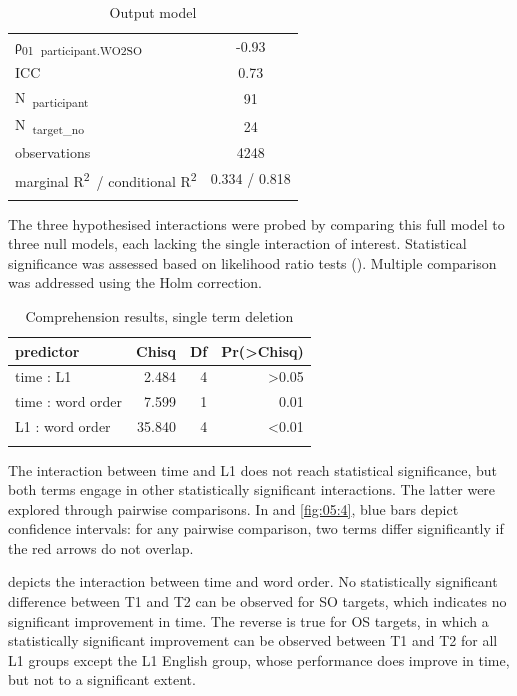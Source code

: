\begin{table}
\begin{tabularx}{\textwidth}{Xrrr}
    ρ\textsubscript{01}~\textsubscript{participant.WO2SO} & \multicolumn{3}{c}{{}-0.93}\\
    ICC & \multicolumn{3}{c}{0.73}\\
    N~\textsubscript{participant} & \multicolumn{3}{c}{91}\\
    N~\textsubscript{target\_no} & \multicolumn{3}{c}{24}\\
    \midrule
    observations & \multicolumn{3}{c}{4248}\\
    marginal R\textsuperscript{2}~/ conditional R\textsuperscript{2} & \multicolumn{3}{c}{0.334 / 0.818}\\
    \lspbottomrule
    \end{tabularx}
    \caption{Output model}
    \label{tab:05:3}
\end{table}

The three hypothesised interactions were probed by comparing this full model to three null models, each lacking the single interaction of interest. Statistical significance was assessed based on likelihood ratio tests (). Multiple comparison was addressed using the Holm correction.

\begin{table}
    \begin{tabularx}{\textwidth}{Xrrr}
    \lsptoprule
    predictor & Chisq & Df & Pr(>Chisq)\\
    \midrule
    time : L1 & 2.484 & 4 & >0.05\\
    time : word order & 7.599 & 1 & 0.01\\
    L1 : word order & 35.840 & 4 & <0.01\\
    \lspbottomrule
    \end{tabularx}
    \caption{Comprehension results, single term deletion}
    \label{tab:05:4}
\end{table}

The interaction between time and L1 does not reach statistical significance, but both terms engage in other statistically significant interactions. The latter were explored through pairwise comparisons. In  and \ref{fig:05:4}, blue bars depict confidence intervals: for any pairwise comparison, two terms differ significantly if the red arrows do not overlap.

 depicts the interaction between time and word order. No statistically significant difference between T1 and T2 can be observed for SO targets, which indicates no significant improvement in time. The reverse is true for OS targets, in which a statistically significant improvement can be observed between T1 and T2 for all L1 groups except the L1 English group, whose performance does improve in time, but not to a significant extent.

